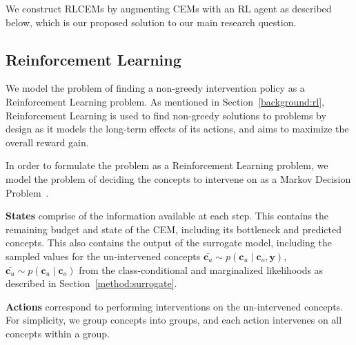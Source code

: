 We construct RLCEMs by augmenting CEMs with an RL agent as 
described below, which is our proposed
solution to our main research question.


\subsection{Reinforcement Learning}\label{method:rl}

We model the problem of finding a non-greedy intervention policy as a 
Reinforcement Learning problem. As mentioned in Section~\ref{background:rl},
Reinforcement Learning is used to find non-greedy solutions to problems
by design as it models the long-term effects of its actions, and aims to 
maximize the overall reward gain. 

In order to formulate the problem
as a Reinforcement Learning problem, we model the problem
of deciding the concepts to intervene on  
as a Markov Decision Problem~\cite{rl-mdp}.

\textbf{States} comprise of the information available
    at each step. This contains the remaining budget and 
    state of the CEM, including its bottleneck and predicted concepts.
    This also contains the output of the surrogate model, 
    including the sampled values for the un-intervened concepts 
    $\bar{\mathbf{c}_u} \sim p(\mathbf{c}_u \mid \mathbf{c}_o, \mathbf{y})$,
    $\bar{\mathbf{c}_u} \sim p(\mathbf{c}_u \mid \mathbf{c}_o)$
    from the class-conditional and marginalized likelihoods
    as described in Section~\ref{method:surrogate}.

\textbf{Actions} correspond to performing interventions 
on the un-intervened concepts.
For simplicity, we group concepts into groups, and each action intervenes on all concepts
within a group.

